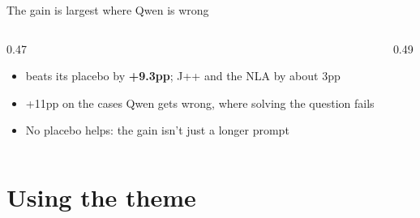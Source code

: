\documentclass[aspectratio=169, 9pt, t]{beamer}
\begin{document}
\begin{frame}{The gain is largest where Qwen is wrong}
  \begin{columns}[T, onlytextwidth]
    \begin{column}{0.47\textwidth}
      \begin{itemize}
        \item \olens{} beats its placebo by \textbf{+9.3pp}; J++ and the NLA by about 3pp
        \item +11pp on the cases Qwen gets wrong, where solving the question fails
        \item No placebo helps: the gain isn't just a longer prompt
      \end{itemize}
    \end{column}
    \begin{column}{0.49\textwidth}
    \end{column}
  \end{columns}
\end{frame}

\section{Using the theme}
\end{document}
